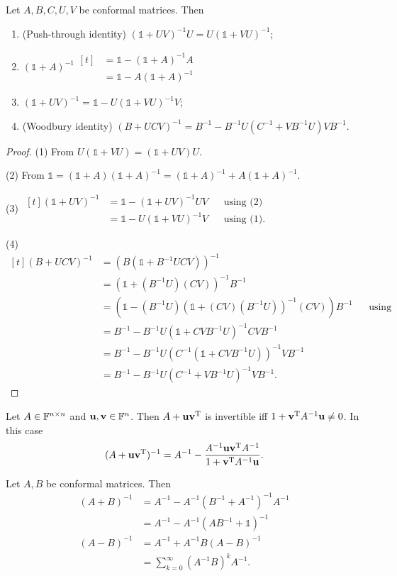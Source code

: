 \begin{proposition}
Let $A,B,C,U,V$ be conformal matrices. Then
\begin{enumerate}
\item \textup{(Push-through identity)} $(\mathbb{1}+UV)^{-1}U = U(\mathbb{1}+VU)^{-1}$;
\item $(\mathbb{1}+A)^{-1} \begin{aligned}[t]
&= \mathbb{1}-(\mathbb{1}+A)^{-1} A\\
&= \mathbb{1}-A(\mathbb{1}+A)^{-1}
\end{aligned}$
\item $(\mathbb{1} + UV)^{-1} = \mathbb{1} - U(\mathbb{1}+VU)^{-1}V$;
\item \textup{(Woodbury identity)} $(B + UCV)^{-1} = B^{-1} - B^{-1}U(C^{-1}+VB^{-1}U)VB^{-1}$.
\end{enumerate}
\end{proposition}
\begin{proof}
(1) From $U(\mathbb{1} + VU) = (\mathbb{1} + UV)U$.

(2) From $\mathbb{1} = (\mathbb{1}+A)(\mathbb{1}+A)^{-1} = (\mathbb{1}+A)^{-1} + A(\mathbb{1}+A)^{-1}$.

(3) $\begin{aligned}[t]
(\mathbb{1} + UV)^{-1} &= \mathbb{1}-(\mathbb{1} + UV)^{-1}UV & &\text{using (2)} \\
&= \mathbb{1}-U(\mathbb{1} + VU)^{-1}V & &\text{using (1)}.
\end{aligned}$

(4) $\begin{aligned}[t]
(B + UCV)^{-1} &= (B(\mathbb{1} + B^{-1}UCV))^{-1} \\
&= (\mathbb{1} + (B^{-1}U)(CV))^{-1}B^{-1} \\
&= (\mathbb{1}-(B^{-1}U)(\mathbb{1} + (CV)(B^{-1}U))^{-1}(CV))B^{-1} & &\text{using (3)}\\
&= B^{-1}-B^{-1}U(\mathbb{1} + CVB^{-1}U)^{-1}CVB^{-1} \\
&= B^{-1}-B^{-1}U(C^{-1}(\mathbb{1} + CVB^{-1}U))^{-1}VB^{-1} \\
&= B^{-1}-B^{-1}U(C^{-1} + VB^{-1}U)^{-1}VB^{-1}.
\end{aligned}$
\end{proof}
\begin{corollary}
Let $A\in\mathbb{F}^{n\times n}$ and $\boldsymbol{\mathrm{u}},\boldsymbol{\mathrm{v}}\in\mathbb{F}^n$. 
Then $A+\boldsymbol{\mathrm{u}}\boldsymbol{\mathrm{v}}^{\mathrm{T}}$ is invertible iff $1 + \boldsymbol{\mathrm{v}}^{\mathrm{T}} A^{-1}\boldsymbol{\mathrm{u}} \neq 0$. In this case
\[ (A+\boldsymbol{\mathrm{u}}\boldsymbol{\mathrm{v}}^{\mathrm{T}})^{-1} = A^{-1} - \frac{A^{-1}\boldsymbol{\mathrm{u}}\boldsymbol{\mathrm{v}}^{\mathrm{T}} A^{-1}}{1 + \boldsymbol{\mathrm{v}}^{\mathrm{T}} A^{-1}\boldsymbol{\mathrm{u}}}. \]
\end{corollary}
\begin{corollary}
Let $A,B$ be conformal matrices. Then
\begin{align*}
(A+B)^{-1} &= A^{-1} - A^{-1}(B^{-1}+A^{-1})^{-1}A^{-1} \\
&= A^{-1} - A^{-1}(AB^{-1}+\mathbb{1})^{-1} \\
(A-B)^{-1} &= A^{-1} + A^{-1}B(A-B)^{-1} \\
&= \sum_{k=0}^\infty (A^{-1}B)^kA^{-1}.
\end{align*}
\end{corollary}

